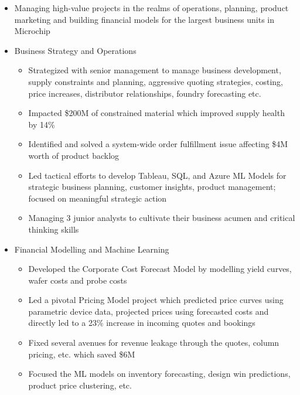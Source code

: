 \documentclass[letterpaper]{article}
\begin{document}
\begin{itemize} [itemsep=1pt, leftmargin=*]
    \item Managing high-value projects in the realms of operations, planning, product marketing and building financial models for the largest business units in Microchip
    \item Business Strategy and Operations
          \vspace{-2mm}
          \begin{itemize} \itemsep 2pt
              \item Strategized with senior management to manage business development, supply constraints and planning, aggressive quoting strategies, costing, price increases, distributor relationships, foundry forecasting etc.
              \item Impacted \$200M of constrained material which improved supply health by 14\%
              \item Identified and solved a system-wide order fulfillment issue affecting \$4M worth of product backlog
              \item Led tactical efforts to develop Tableau, SQL, and Azure ML Models for strategic business planning, customer insights, product management; focused on meaningful strategic action
              \item Managing 3 junior analysts to cultivate their business acumen and critical thinking skills
          \end{itemize}
          \vspace{-1mm}
    \item Financial Modelling and Machine Learning
          \vspace{-2mm}
          \begin{itemize} \itemsep 2pt
              \item Developed the Corporate Cost Forecast Model by modelling yield curves, wafer costs and probe costs
              \item Led a pivotal Pricing Model project which predicted price curves using parametric device data, projected prices using forecasted costs and directly led to a 23\% increase in incoming quotes and bookings
              \item Fixed several avenues for revenue leakage through the quotes, column pricing, etc. which saved \$6M 
              \item Focused the ML models on inventory forecasting, design win predictions, product price clustering, etc.
          \end{itemize}

\end{itemize}
\end{document}
